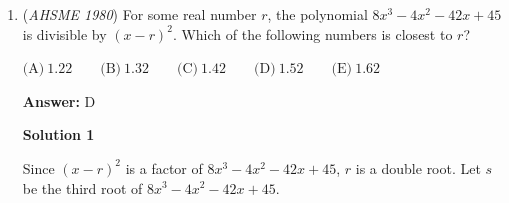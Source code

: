 \begin{enumerate}
\textbf{Solution 2 (Stewart's Theorem)}

Let $A$, $B$, and $C$ be the vertices of the right triangle, where $C$ is the right angle.  Let $a$, $b$, and $c$ be the lengths of the sides opposite $A$, $B$, and $C$, respectively. Let $M$ and $N$ be the trisection points of $\overline{AB}$.  Let $m = CM$ and $n = CN$.

 Using Stewart's Theorem on $\triangle ABC$ with segment $CM$ yields:

 
 \[m^2 \cdot c + \frac{2}{3}c \cdot \frac{1}{3}c \cdot c = a^2 \cdot \frac{1}{3}c + b^2 \cdot \frac{2}{3}c\]

 Dividing both sides by $c$ and isolating $m^2$ yields:

 
 \[m^2 = \frac{1}{3}a^2 + \frac{2}{3}b^2 - \frac{2}{9}c^2\ (\textrm{i})\]

 Using Stewart's Theorem on $\triangle ABC$ with segment $CN$ yields:

 
 \[n^2 \cdot c + \frac{2}{3}c \cdot \frac{1}{3}c \cdot c =a^2 \cdot \frac{2}{3}c + b^2 \cdot \frac{1}{3}c\]

 Dividing both sides by $c$ and isolating $n^2$ yields:

 
 \[n^2 = \frac{2}{3}a^2 + \frac{1}{3}b^2 - \frac{2}{9}c^2\ (\textrm{ii})\]

 Adding equations $(\textrm{i})$ and $(\textrm{ii})$ yields:

 
 \[m^2 + n^2 = a^2 + b^2 - \frac{4}{9}c^2\].

 Either $m = \sin x$ and $n = \cos x$, or $m = \cos x$ and $n = \sin x$.  In both cases, $m^2 + n^2 = \sin^2 x + \cos^2 x = 1$.  Also, by the Pythagorean theorem, $a^2 + b^2 = c^2$.

 Therefore, $1=c^2 - \frac{4}{9}c^2 = \frac{5}{9}c^2$, so $c^2 = \frac{9}{5}$ and $c = \sqrt{\frac{9}{5}} = \boxed{(\textbf{C})\ \frac{3\sqrt{5}}{5}}$.

 


	\item (\textit{AHSME 1980}) For some real number $r$, the polynomial $8x^3-4x^2-42x+45$ is divisible by $(x-r)^2$. Which of the following numbers is closest to $r$? 


 $\text{(A)} \ 1.22 \qquad  \text{(B)} \ 1.32 \qquad  \text{(C)} \ 1.42 \qquad  \text{(D)} \ 1.52 \qquad  \text{(E)} \ 1.62$

 \textbf{Answer: }D



\textbf{Solution 1}

Since $(x-r)^2$ is a factor of $8x^3-4x^2-42x+45$, $r$ is a double root. Let $s$ be the third root of $8x^3-4x^2-42x+45$. 


\end{enumerate}
